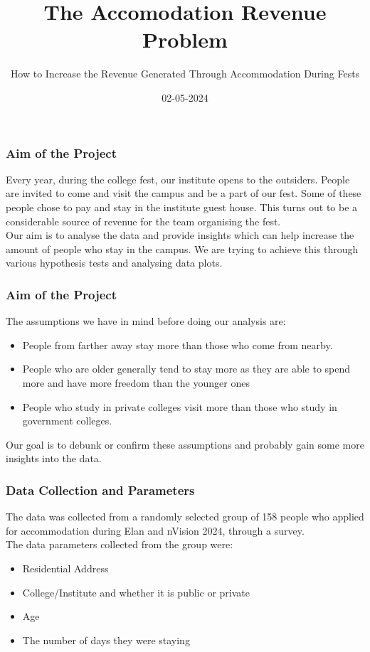 \documentclass{beamer}
\title{The Accomodation Revenue Problem  }
\author[Team 1]{How to Increase the Revenue
Generated Through Accommodation During Fests}
\institute[]{Indian Institute of Technology Hyderabad}
\date{02-05-2024}
\begin{document}
\frame{\titlepage}



\begin{frame}
\frametitle{Aim of the Project}
\large Every year, during the college fest, our institute opens to the outsiders. People are invited to come and visit the campus and be a part of our fest. Some of these people chose to pay and stay in the institute guest house. This turns out to be a considerable source of revenue for the team organising the fest. \\
\vspace{5mm}
Our aim is to analyse the data and provide insights which can help increase the amount of people who stay in the campus. We are trying to achieve this through various hypothesis tests and analysing data plots. 
\end{frame}

\begin{frame}
\frametitle{Aim of the Project}
The assumptions we have in mind before doing our analysis are:
\begin{itemize}
    \item People from farther away stay more than those who come from nearby.
    \item People who are older generally tend to stay more as they are able to spend more and have more freedom than the younger ones
    \item People who study in private colleges visit more than those who study in government colleges.
\end{itemize}
Our goal is to debunk or confirm these assumptions and probably gain some more insights into the data.
\end{frame}

\begin{frame}
\frametitle{Data Collection and Parameters}
The data was collected from a randomly selected group of 158 people who applied for accommodation during Elan and nVision 2024, through a survey.\\
\vspace{5mm}
The data parameters collected from the group were:
\begin{itemize}
    \item Residential Address
    \item College/Institute and whether it is public or private
    \item Age
    \item The number of days they were staying
\end{itemize}
\end{frame}
\end{document}
